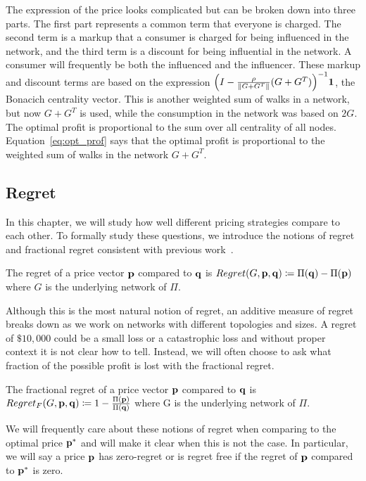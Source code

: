 The expression of the price looks complicated but can be broken down into three parts. The first part represents a common term that everyone is charged. The second term is a markup that a consumer is charged for being influenced in the network, and the third term is a discount for being influential in the network. A consumer will frequently be both the influenced and the influencer. These markup and discount terms are based on the expression ${\left(I - \frac{\rho}{\|G+G^T\|} (G+G^T) \right)}^{-1} \mathbf{1}$, the Bonacich centrality vector. This is another weighted sum of walks in a network, but now $G+G^T$ is used, while the consumption in the network was based on $2G$. The optimal profit is proportional to the sum over all centrality of all nodes. Equation~\ref{eq:opt_prof} says that the optimal profit is proportional to the weighted sum of walks in the network $G+G^T$. 

\subsection{Regret}

In this chapter, we will study how well different pricing strategies compare to each other. To formally study these questions, we introduce the notions of regret and fractional regret consistent with previous work~\cite{huang2022value}. 

\begin{definition}
    The regret of a price vector $\mathbf{p}$ compared to $\mathbf{q}$ is $Regret(G, \mathbf{p}, \mathbf{q}) \coloneqq \Pi(\mathbf{q}) - \Pi(\mathbf{p})$ where $G$ is the underlying network of $\Pi$.
\end{definition}

Although this is the most natural notion of regret, an additive measure of regret breaks down as we work on networks with different topologies and sizes. A regret of  $\$10,000$ could be a small loss or a catastrophic loss and without proper context it is not clear how to tell. Instead, we will often choose to ask what fraction of the possible profit is lost with the fractional regret. 

\begin{definition}
    The fractional regret of a price vector $\mathbf{p}$ compared to $\mathbf{q}$ is $Regret_F(G, \mathbf{p}, \mathbf{q}) \coloneqq 1 - \frac{\Pi(\mathbf{p})}{\Pi(\mathbf{q})}$
    where G is the underlying network of $\Pi$.
\end{definition}

We will frequently care about these notions of regret when comparing to the optimal price $\mathbf{p}^*$ and will make it clear when this is not the case.  In particular, we will say a price $\mathbf{p}$ has zero-regret or is regret free if the regret of $\mathbf{p}$  compared to $\mathbf{p}^*$ is zero. 


